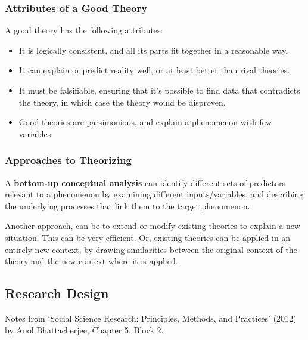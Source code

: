 \subsubsection{Attributes of a Good Theory}

A good theory has the following attributes:

\begin{itemize}
  \item It is logically consistent, and all its parts fit together in a
    reasonable way.
  \item It can explain or predict reality well, or at least better
    than rival theories.
  \item It must be falsifiable, ensuring that it's possible to find
    data that contradicts the theory, in which case the theory would
    be disproven.
  \item Good theories are parsimonious, and explain a phenomenon with
    few variables.
\end{itemize}


\subsubsection{Approaches to Theorizing}


A \textbf{bottom-up conceptual analysis} can identify different sets
of predictors relevant to a phenomenon by examining different
inputs/variables, and describing the underlying processes that link
them to the target phenomenon.

Another approach, can be to extend or modify existing theories to
explain a new situation. This can be very efficient. Or, existing
theories can be applied in an entirely new context, by drawing
similarities between the original context of the theory and the new
context where it is applied.

\subsection{Research Design}
\begin{flushright}
  \scriptsize Notes from `Social Science Research: Principles, Methods, and
  Practices' (2012) by Anol Bhattacherjee, Chapter 5. Block 2.
\end{flushright}



